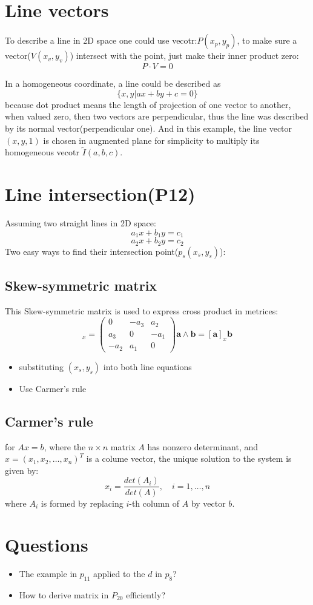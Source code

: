 \documentclass{article}
\begin{document}
    \section{Line vectors}
    To describe a line in 2D space one could use vecotr:$P(x_{p}, y_{p})$, to make sure a vector($V(x_{v},y_{v})$) intersect with the point, just make their inner product zero:
    $$P\cdot V = 0$$

    In a homogeneous coordinate, a line could be described as $$\{x,y \vert ax+by+c=0\}$$ because dot product means the length of projection of one vector to another, when valued zero, then two vectors are perpendicular, thus the line was described by its normal vector(perpendicular one). And in this example, the line vector $(x,y,1)$ is chosen in augmented plane for simplicity to multiply its homogeneous vecotr $\tilde{I}(a,b,c)$. 

    \section{Line intersection(P12)}
    Assuming two straight lines in 2D space:
    $$a_{1}x + b_{1}y = c_{1}$$
    $$a_{2}x + b_{2}y = c_{2}$$
    Two easy ways to find their intersection point($p_{s}(x_{s}, y_{s})$):
    \subsection{Skew-symmetric matrix}
    This Skew-symmetric matrix is used to express cross product in metrices:
    \begin{equation*}
	    [\textbf{a}]_{x} = 
	    \begin{pmatrix}
		0 & -a_{3} & a_{2} \\
		a_{3} & 0 & -a_{1} \\
		-a_{2} & a_{1} & 0 
	    \end{pmatrix}

	    \textbf{a} \wedge \textbf{b} = [\textbf{a}]_{x} \textbf{b}
    \end{equation*}
    \begin{itemize}
    \item substituting $(x_{s}, y_{s})$ into both line equations
    \item Use Carmer's rule
    \end{itemize}

    \subsection*{Carmer's rule}
    for $Ax=b$, where the $n\times n$ matrix $A$ has nonzero determinant, and $x=(x_{1},x_{2},\dots,x_{n})^{T}$ is a colume vector, the unique solution to the system is given by:
    $$x_{i} = \frac{det(A_{i})}{det(A)}, \quad  i = 1,\dots,n$$
    where $A_{i}$ is formed by replacing $i$-th column of $A$ by vector $b$.
    
    \section{Questions}
    \begin{itemize}
    \item The example in $p_{11}$ applied to the $d$ in $p_{8}$?
    \item How to derive matrix in $P_{20}$ efficiently?
    \end{itemize}
    
\end{document}
